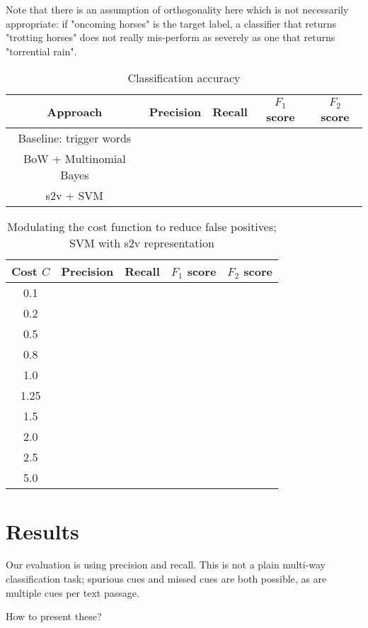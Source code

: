 \documentclass[10pt,a4paper]{article}
\begin{document}
Note that there is an assumption of orthogonality here which is not necessarily appropriate: if "oncoming horses" is the target label, a classifier that returns "trotting horses" does not really mis-perform as severely as one that returns "torrential rain".



\begin{table*}
\centering
\footnotesize
\begin{tabular}{c|cccc}
\hline
{\bf Approach} & {\bf Precision} & {\bf Recall} & {\bf $F_1$ score} & {\bf $F_2$ score} \\
\hline
Baseline: trigger words &&&& \\
BoW + Multinomial Bayes &&&& \\
s2v + SVM &&&& \\
\hline
\end{tabular}
\label{tab:results-main}
\caption{Classification accuracy}
\end{table*}

\begin{table*}
\centering
\footnotesize
\begin{tabular}{c|cccc}
\hline
{\bf Cost $C$} & {\bf Precision} & {\bf Recall} & {\bf $F_1$ score} & {\bf $F_2$ score} \\
\hline
0.1 &&&& \\
0.2 &&&& \\
0.5 &&&& \\
0.8 &&&& \\
1.0 &&&& \\
1.25 &&&& \\
1.5 &&&& \\
2.0 &&&& \\
2.5 &&&& \\
5.0 &&&& \\
\hline
\end{tabular}
\label{tab:results-cost}
\caption{Modulating the cost function to reduce false positives; SVM with s2v representation}
\end{table*}


\section{Results}

Our evaluation is using precision and recall.
This is not a plain multi-way classification task; spurious cues and missed cues are both possible, as are multiple cues per text passage.

How to present these?
\end{document}
